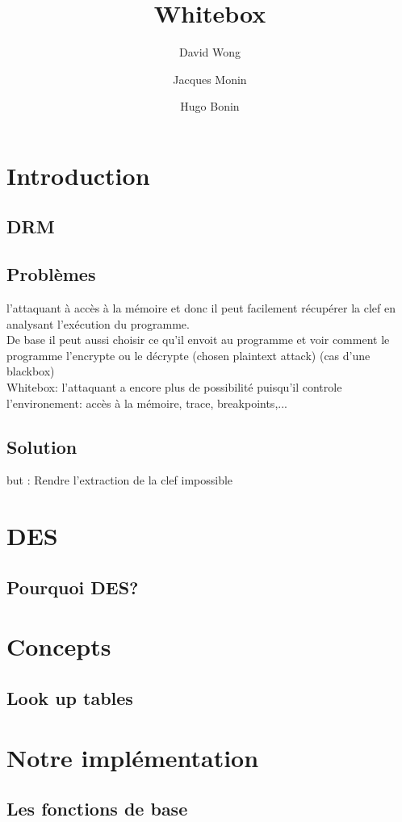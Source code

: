 \documentclass[a4paper,12pt]{article}
\author{David Wong
  \and Jacques Monin
  \and Hugo Bonin}
\title{Whitebox}
\begin{document}
\maketitle


\section{Introduction}

\subsection{DRM}

\subsection{Problèmes}

l'attaquant à accès à la mémoire et donc il peut facilement récupérer la clef en analysant l'exécution du programme.\\
De base il peut aussi choisir ce qu'il envoit au programme et voir comment le programme l'encrypte ou le décrypte (chosen plaintext attack) (cas d'une blackbox)\\
Whitebox: l'attaquant a encore plus de possibilité puisqu'il controle l'environement: accès à la mémoire, trace, breakpoints,...

\subsection{Solution}

but : Rendre l'extraction de la clef impossible

\section{DES}

\subsection{Pourquoi DES?}

\section{Concepts}

\subsection{Look up tables}

\section{Notre implémentation}

\subsection{Les fonctions de base}
\end{document}

